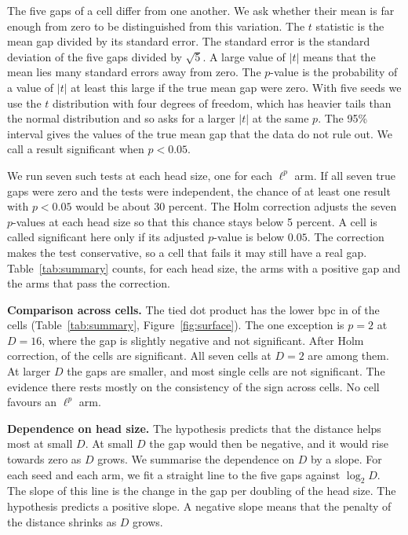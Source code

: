 \documentclass[11pt]{article}
\begin{document}
The five gaps of a cell differ from one another.
We ask whether their mean is far enough from zero to be distinguished from this variation.
The $t$ statistic is the mean gap divided by its standard error.
The standard error is the standard deviation of the five gaps divided by $\sqrt5$.
A large value of $|t|$ means that the mean lies many standard errors away from zero.
The $p$-value is the probability of a value of $|t|$ at least this large if the true mean gap were zero.
With five seeds we use the $t$ distribution with four degrees of freedom, which has heavier tails than the normal distribution and so asks for a larger $|t|$ at the same $p$.
The 95\% interval gives the values of the true mean gap that the data do not rule out.
We call a result significant when $p<0.05$.

We run seven such tests at each head size, one for each $\ell^p$ arm.
If all seven true gaps were zero and the tests were independent, the chance of at least one result with $p<0.05$ would be about 30 percent.
The Holm correction adjusts the seven $p$-values at each head size so that this chance stays below 5 percent.
A cell is called significant here only if its adjusted $p$-value is below $0.05$.
The correction makes the test conservative, so a cell that fails it may still have a real gap.
Table~\ref{tab:summary} counts, for each head size, the arms with a positive gap and the arms that pass the correction.

\textbf{Comparison across cells.}
The tied dot product has the lower bpc in \nPositive{} of the \nTested{} cells (Table~\ref{tab:summary}, Figure~\ref{fig:surface}).
The one exception is $p=2$ at $D=16$, where the gap is slightly negative and not significant.
After Holm correction, \nHolm{} of the \nTested{} cells are significant.
All seven cells at $D=2$ are among them.
At larger $D$ the gaps are smaller, and most single cells are not significant.
The evidence there rests mostly on the consistency of the sign across cells.
No cell favours an $\ell^p$ arm.

\textbf{Dependence on head size.}
The hypothesis predicts that the distance helps most at small $D$.
At small $D$ the gap would then be negative, and it would rise towards zero as $D$ grows.
We summarise the dependence on $D$ by a slope.
For each seed and each arm, we fit a straight line to the five gaps against $\log_2 D$.
The slope of this line is the change in the gap per doubling of the head size.
The hypothesis predicts a positive slope.
A negative slope means that the penalty of the distance shrinks as $D$ grows.
\end{document}
